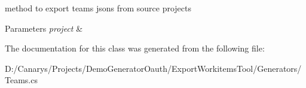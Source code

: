 method to export teams jsons from source projects 


\begin{DoxyParams}{Parameters}
{\em project} & \\
\hline
\end{DoxyParams}


The documentation for this class was generated from the following file\+:\begin{DoxyCompactItemize}
\item 
D\+:/\+Canarys/\+Projects/\+Demo\+Generator\+Oauth/\+Export\+Workitems\+Tool/\+Generators/Teams.\+cs\end{DoxyCompactItemize}
